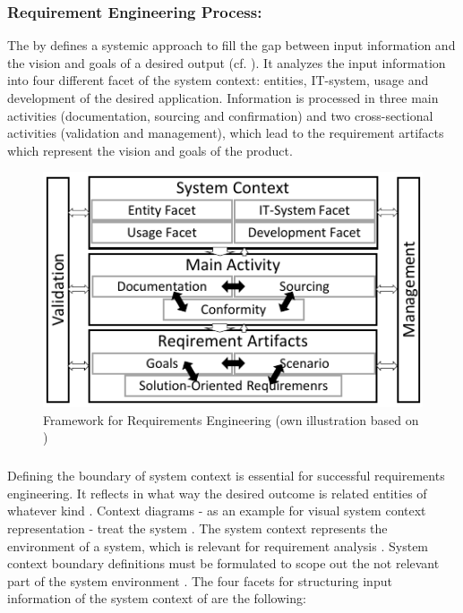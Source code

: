 \subsubsection{Requirement Engineering Process:} The by \textcite{Pohl.2007} defines a systemic approach to fill the gap between input information and the vision and goals of a desired output (cf. ). It analyzes the input information into four different facet of the system context: entities, IT-system, usage and development of the desired application. Information is processed in three main activities (documentation, sourcing and confirmation) and two cross-sectional activities (validation and management), which lead to the requirement artifacts which represent the vision and goals of the product. \parencite[cf.][38-39]{Pohl.2007}
\begin{figure}[H]
    \centering
    \includegraphics[scale=1.5]{img/ReqAnFrameWork.pdf}
    \caption[Framework for Requirements Engineering]{Framework for Requirements Engineering (own illustration based on \cite[41]{Pohl.2007})}
    \label{fig:reqFramework}
\end{figure}
\subparagraph{} \label{beginFacets} Defining the boundary of system context is essential for successful requirements engineering. It reflects in what way the desired outcome is related entities of whatever kind \parencite[55]{Pohl.2007}. Context diagrams \parencites[cf.][266]{Kossiakoff.2011} - as an example for visual system context representation - treat the system  \parencite[76]{Lauesen.2008}. The system context represents the environment of a system, which is relevant for requirement analysis \parencite[55]{Pohl.2007}. System context boundary definitions must be formulated to scope out the not relevant part of the system environment \parencite[55-56]{Pohl.2007}. The four facets for structuring input information of the system context of \textcite{Pohl.2007} are the following:
